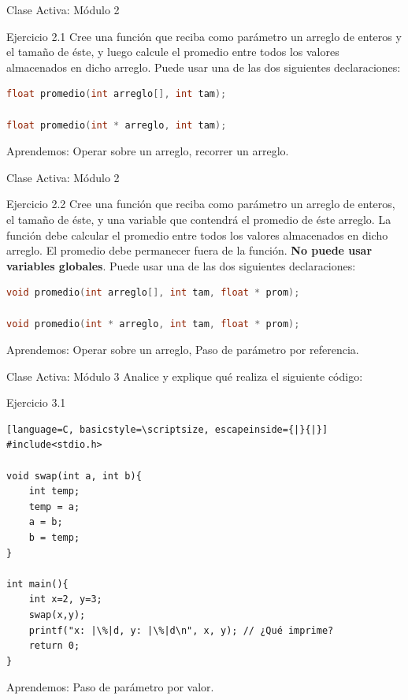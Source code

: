 \documentclass{beamer}
\begin{document}
\begin{frame}[fragile]{Clase Activa: Módulo 2}
\begin{exampleblock}{Ejercicio 2.1}
Cree una función que reciba como parámetro un arreglo de enteros y el tamaño de éste, y luego calcule el promedio entre todos los valores almacenados en dicho arreglo. Puede usar una de las dos siguientes declaraciones:
\begin{lstlisting}[language=C, basicstyle=\scriptsize]
float promedio(int arreglo[], int tam);

float promedio(int * arreglo, int tam);
\end{lstlisting}
\end{exampleblock}

{\tiny Aprendemos: Operar sobre un arreglo, recorrer un arreglo.}
\end{frame}

\begin{frame}[fragile]{Clase Activa: Módulo 2}
\begin{exampleblock}{Ejercicio 2.2}
Cree una función que reciba como parámetro un arreglo de enteros, el tamaño de éste, y una variable que contendrá el promedio de éste arreglo. La función debe calcular el promedio entre todos los valores almacenados en dicho arreglo. El promedio debe permanecer fuera de la función. \textbf{No puede usar variables globales}. Puede usar una de las dos siguientes declaraciones:
\begin{lstlisting}[language=C, basicstyle=\scriptsize]
void promedio(int arreglo[], int tam, float * prom);

void promedio(int * arreglo, int tam, float * prom);
\end{lstlisting}
\end{exampleblock}

{\tiny Aprendemos: Operar sobre un arreglo, Paso de parámetro por referencia.}
\end{frame}

\begin{frame}[fragile]{Clase Activa: Módulo 3}
Analice y explique qué realiza el siguiente código:
\begin{exampleblock}{Ejercicio 3.1}
\begin{lstlisting}[language=C, basicstyle=\scriptsize, escapeinside={|}{|}]
#include<stdio.h>

void swap(int a, int b){
	int temp;
	temp = a;
	a = b;
	b = temp;
}

int main(){
	int x=2, y=3;
	swap(x,y);
	printf("x: |\%|d, y: |\%|d\n", x, y); // ¿Qué imprime?
	return 0;
}
\end{lstlisting}
\end{exampleblock}

{\tiny Aprendemos: Paso de parámetro por valor.}
\end{frame}
\end{document}
